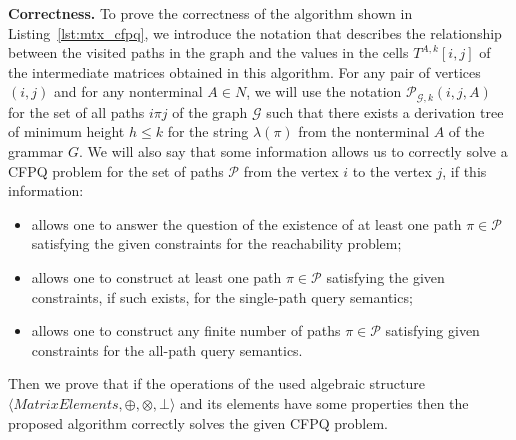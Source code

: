 \textbf{Correctness.} %
To prove the correctness of the algorithm shown in Listing~\ref{lst:mtx_cfpq}, we introduce the notation that describes the relationship between the visited paths in the graph and the values in the cells $T^{A, k}[i, j]$ of the intermediate matrices obtained in this algorithm. For any pair of vertices $(i, j)$ and for any nonterminal $A \in N$, we will use the notation $\mathcal{P}_{\mathcal{G}, k}(i, j, A)$ for the set of all paths $i \pi j$ of the graph $\mathcal{G}$ such that there exists a derivation tree of minimum height $h \leq k$ for the string $\lambda(\pi)$ from the nonterminal $A$ of the grammar $G$. We will also say that some information allows us to correctly solve a CFPQ problem for the set of paths $\mathcal{P}$ from the vertex $i$ to the vertex $j$, if this information:
\begin{itemize}
    \item allows one to answer the question of the existence of at least one path $\pi \in \mathcal{P}$ satisfying the given constraints for the reachability problem;
    \item allows one to construct at least one path $\pi \in \mathcal{P}$ satisfying the given constraints, if such exists, for the single-path query semantics;
    \item allows one to construct any finite number of paths $\pi \in \mathcal{P}$ satisfying given constraints for the all-path query semantics.
\end{itemize}

Then we prove that if the operations of the used algebraic structure $\langle \textit{MatrixElements}, \oplus, \otimes, \bot \rangle$ and its elements have some properties then the proposed algorithm correctly solves the given CFPQ problem.

